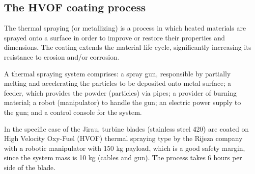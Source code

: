 \subsection{The HVOF coating process}\label{sec::desc_hvof}
The thermal spraying (or metallizing) is a process in which
heated materials are sprayed onto a surface in order to improve or
restore their properties and dimensions. The coating extends the material life
cycle, significantly increasing its resistance to erosion and/or corrosion. 


A thermal spraying system comprises: a spray gun, responsible
by partially melting and accelerating the particles to be deposited onto metal
surface; a feeder, which provides the powder (particles) via pipes;
a provider of burning material; a robot (manipulator) to handle the gun; an
electric power supply to the gun; and a control console for the system.

In the specific case of the Jirau, turbine blades (stainless steel 420) %
are coated on High Velocity Oxy-Fuel (HVOF) thermal spraying type by the
Rijeza company with a robotic manipulator with 150 kg payload, which is a good
safety margin, since the system mass is 10 kg (cables and gun). The process
takes 6 hours per side of the blade.

